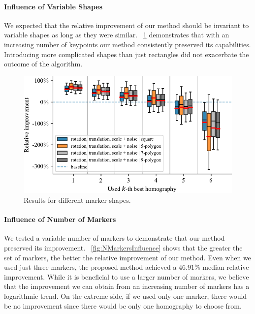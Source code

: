 \paragraph{Influence of Variable Shapes}
We expected that the relative improvement of our method should be invariant to variable shapes as long as they were similar. \figstr{}~\ref{fig:ShapeInfluence} demonstrates that with an increasing number of keypoints our method consistently preserved its capabilities. Introducing more complicated shapes than just rectangles did not exacerbate the outcome of the algorithm.

\begin{figure}[t]
    \centering
    \includegraphics[width=\boxplotimgwidth]{figures/homography/shape_influence.pdf}
    \caption[Influence of marker shape]{Results for different marker shapes.}
    \label{fig:ShapeInfluence}
\end{figure}

\paragraph{Influence of Number of Markers}
We tested a variable number of markers to demonstrate that our method preserved its improvement. \figstr{}~\ref{fig:NMarkersInfluence} shows that the greater the set of markers, the better the relative improvement of our method. Even when we used just three markers, the proposed method achieved a $46.91$\% median relative improvement.
While it is beneficial to use a larger number of markers, we believe that the improvement we can obtain from an increasing number of markers has a logarithmic trend. On the extreme side, if we used only one marker, there would be no improvement since there would be only one homography to choose from.

